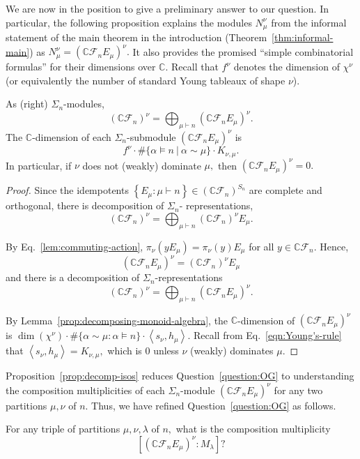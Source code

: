 \documentclass[ALCO, Unicode]{cedram}
\def\C{{\mathbb{C}}}
\begin{document}
We are now in the position to give a preliminary answer to our question. In particular, the following proposition explains the modules $N_\mu^{\nu}$ from the informal statement of the main theorem in the introduction (Theorem~\ref{thm:informal-main}) as $N_\mu^{\nu} = \left(\C \mathcal{F}_n E_\mu\right)^{\nu}.$ It also provides the promised ``simple combinatorial formulas'' for their dimensions over $\C.$ Recall that $f^\nu$ denotes the dimension of $\chi^\nu$ (or equivalently the number of standard Young tableaux of shape $\nu$). 

\begin{prop}\label{prop:decomp-isos}
As (right) $\Sigma_n$-modules,
    \[\left(\C \mathcal{F}_n\right)^{\nu} =\bigoplus_{\mu \vdash n}(\C \mathcal{F}_n E_\mu)^{\nu}.\] The $\C$-dimension of each $\Sigma_n$-submodule $\left(\C \mathcal{F}_nE_\mu \right)^{\nu}$ is \[f^\nu \cdot \#\{\alpha \vDash n \ | \ \alpha \sim \mu\}\cdot K_{\nu, \mu}.\] 
    In particular, if $\nu$ does not (weakly) dominate $\mu,$ then $\left(\C \mathcal{F}_n E_\mu \right)^\nu = 0.$
\end{prop}


\begin{proof}
Since the idempotents $\left\{E_{\mu}: \mu \vdash n\right\} \in \left (\C \mathcal{F}_n \right)^{S_n}$ are complete and orthogonal, there is decomposition of $\Sigma_n$- representations,
\[\left(\C \mathcal{F}_n\right)^\nu = \bigoplus_{\mu \vdash n}\left(\C \mathcal{F}_n\right)^\nu E_{\mu}.\]

By Eq.~\eqref{lem:commuting-action}, $\pi_\nu (yE_\mu) = \pi_\nu(y) E_\mu$ for all $y \in \C \mathcal{F}_n. $ Hence, 
 \[\left(\C \mathcal{F}_n E_{\mu}\right)^\nu = \left(\C \mathcal{F}_n \right)^\nu E_{\mu}\] and there is a decomposition of $\Sigma_n$-representations \[\left(\C\mathcal{F}_n \right)^\nu = \bigoplus_{\mu \vdash n} \left(\C \mathcal{F}_n E_\mu\right)^\nu.\]

By Lemma~\ref{prop:decomposing-monoid-algebra}, the $\C$-dimension of $\left(\C \mathcal{F}_n E_{\mu}\right)^\nu$ is $ \dim \left(\chi^\nu\right) \cdot \# \{\alpha \sim \mu: \alpha \vDash n\} \cdot \left \langle s_\nu, h_\mu \right \rangle.$ Recall from Eq.~\eqref{eqn:Young's-rule} that $\left \langle s_\nu, h_\mu \right \rangle= K_{\nu, \mu},$ which is $0$ unless $\nu$ (weakly) dominates $\mu.$ 
\end{proof}




Proposition~\ref{prop:decomp-isos} reduces Question~\ref{question:OG} to understanding the composition multiplicities of each $\Sigma_n$-module $\left(\C \mathcal{F}_n E_\mu \right)^\nu$ for any two partitions $\mu, \nu$ of $n.$  Thus, we have refined Question~\ref{question:OG} as follows.
\begin{question}\label{quest:2'}
For any triple of partitions $\mu, \nu, \lambda$ of $n,$  what is the composition multiplicity \[[(\C \mathcal{F}_nE_\mu)^{\nu}:M_\lambda]?\]
\end{question}
\end{document}
